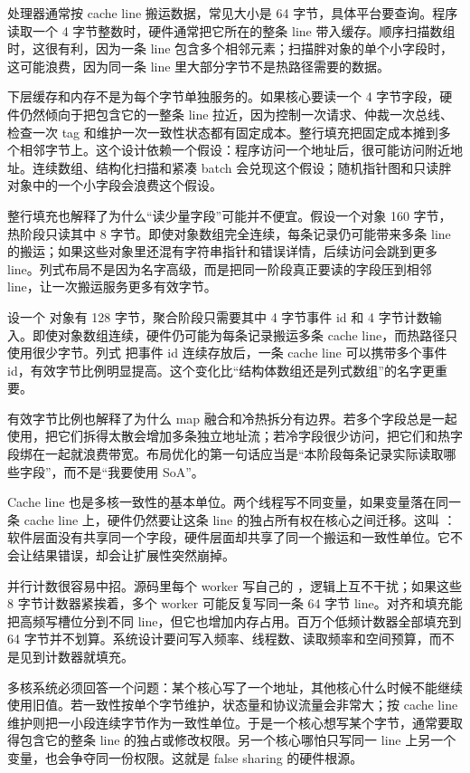 处理器通常按 cache line 搬运数据，常见大小是 64 字节，具体平台要查询。程序读取一个 4 字节整数时，硬件通常把它所在的整条 line 带入缓存。顺序扫描数组时，这很有利，因为一条 line 包含多个相邻元素；扫描胖对象的单个小字段时，这可能浪费，因为同一条 line 里大部分字节不是热路径需要的数据。

下层缓存和内存不是为每个字节单独服务的。如果核心要读一个 4 字节字段，硬件仍然倾向于把包含它的一整条 line 拉近，因为控制一次请求、仲裁一次总线、检查一次 tag 和维护一次一致性状态都有固定成本。整行填充把固定成本摊到多个相邻字节上。这个设计依赖一个假设：程序访问一个地址后，很可能访问附近地址。连续数组、结构化扫描和紧凑 batch 会兑现这个假设；随机指针图和只读胖对象中的一个小字段会浪费这个假设。

整行填充也解释了为什么“读少量字段”可能并不便宜。假设一个对象 160 字节，热阶段只读其中 8 字节。即使对象数组完全连续，每条记录仍可能带来多条 line 的搬运；如果这些对象里还混有字符串指针和错误详情，后续访问会跳到更多 line。列式布局不是因为名字高级，而是把同一阶段真正要读的字段压到相邻 line，让一次搬运服务更多有效字节。

设一个  对象有 128 字节，聚合阶段只需要其中 4 字节事件 id 和 4 字节计数输入。即使对象数组连续，硬件仍可能为每条记录搬运多条 cache line，而热路径只使用很少字节。列式  把事件 id 连续存放后，一条 cache line 可以携带多个事件 id，有效字节比例明显提高。这个变化比“结构体数组还是列式数组”的名字更重要。

有效字节比例也解释了为什么 map 融合和冷热拆分有边界。若多个字段总是一起使用，把它们拆得太散会增加多条独立地址流；若冷字段很少访问，把它们和热字段绑在一起就浪费带宽。布局优化的第一句话应当是“本阶段每条记录实际读取哪些字段”，而不是“我要使用 SoA”。

Cache line 也是多核一致性的基本单位。两个线程写不同变量，如果变量落在同一条 cache line 上，硬件仍然要让这条 line 的独占所有权在核心之间迁移。这叫 ：软件层面没有共享同一个字段，硬件层面却共享了同一个搬运和一致性单位。它不会让结果错误，却会让扩展性突然崩掉。

并行计数很容易中招。源码里每个 worker 写自己的 ，逻辑上互不干扰；如果这些 8 字节计数器紧挨着，多个 worker 可能反复写同一条 64 字节 line。对齐和填充能把高频写槽位分到不同 line，但它也增加内存占用。百万个低频计数器全部填充到 64 字节并不划算。系统设计要问写入频率、线程数、读取频率和空间预算，而不是见到计数器就填充。

多核系统必须回答一个问题：某个核心写了一个地址，其他核心什么时候不能继续使用旧值。若一致性按单个字节维护，状态量和协议流量会非常大；按 cache line 维护则把一小段连续字节作为一致性单位。于是一个核心想写某个字节，通常要取得包含它的整条 line 的独占或修改权限。另一个核心哪怕只写同一 line 上另一个变量，也会争夺同一份权限。这就是 false sharing 的硬件根源。

